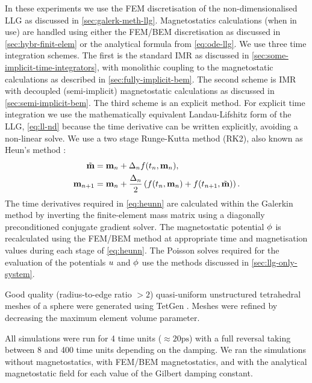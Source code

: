 In these experiments we use the FEM discretisation of the non-dimensionalised LLG as discussed in \cref{sec:galerk-meth-llg}.
Magnetostatics calculations (when in use) are handled using either the FEM/BEM discretisation as discussed in \cref{sec:hybr-finit-elem} or the analytical formula from \cref{eq:ode-llg}.
We use three time integration schemes.
The first is the standard IMR as discussed in \cref{sec:some-implicit-time-integrators}, with monolithic coupling to the magnetostatic calculations as described in \cref{sec:fully-implicit-bem}.
The second scheme is IMR with decoupled (semi-implicit) magnetostatic calculations as discussed in \cref{sec:semi-implicit-bem}.
The third scheme is an explicit method.
For explicit time integration we use the mathematically equivalent Landau-Lifshitz form of the LLG, \cref{eq:ll-nd} because the time derivative can be written explicitly, avoiding a non-linear solve.
We use a two stage Runge-Kutta method (RK2), also known as Heun's method \cite[58]{Atkinson2009}:
\begin{equation}
  \label{eq:heunn}
  \begin{aligned}
    \tilde{\boldsymbol{\mathrm{m}}} &= \boldsymbol{\mathrm{m}}_n + \Delta_{n} f(t_n, \boldsymbol{\mathrm{m}}_n), \\
    \boldsymbol{\mathrm{m}}_{n+1} &= \boldsymbol{\mathrm{m}}_n + \frac{\Delta_{n}}{2} \left( f(t_n, \boldsymbol{\mathrm{m}}_n) + f(t_{n+1},
      \tilde{\boldsymbol{\mathrm{m}}}) \right).
  \end{aligned}
\end{equation}
The time derivatives required in \cref{eq:heunn} are calculated within the Galerkin method by inverting the finite-element mass matrix using a diagonally preconditioned conjugate gradient solver.
The magnetostatic potential $\phi$ is recalculated using the FEM/BEM method at appropriate time and magnetisation values during each stage of \cref{eq:heunn}.
The Poisson solves required for the evaluation of the potentials $u$ and $\phi$ use the methods discussed in \cref{sec:llg-only-system}.



Good quality (radius-to-edge ratio $ > 2$) quasi-uniform unstructured tetrahedral meshes of a sphere were generated using TetGen \cite{tetgen-website}.
Meshes were refined by decreasing the maximum element volume parameter.

All simulations were run for 4 time units ($\approx 20\text{ps}$) with a full reversal taking between 8 and 400 time units depending on the damping.
We ran the simulations without magnetostatics, with FEM/BEM magnetostatics, and with the analytical magnetostatic field for each value of the Gilbert damping constant.

